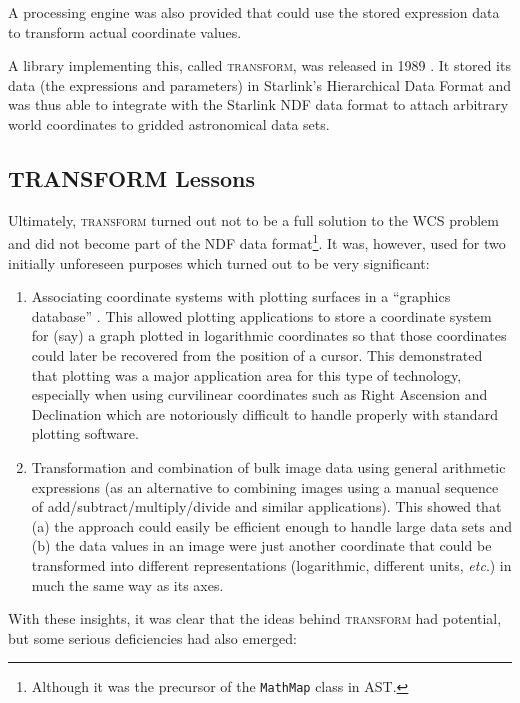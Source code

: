 \documentclass[final,authoryear,5p,times,twocolumn]{elsarticle}
\begin{document}
A processing engine was also provided that could use the stored
expression data to transform actual coordinate values.

A library implementing this, called \textsc{transform}, was released
in 1989 \citep{SUN61,1989StarB...4....7L}. It stored its data (the
expressions and parameters) in Starlink's Hierarchical Data Format
\citep[HDS;][]{SUN92,SSN27,2015HDS} and was thus able to integrate with the
Starlink NDF data format to attach arbitrary world coordinates to
gridded astronomical data sets.


\subsection{TRANSFORM Lessons}

Ultimately, \textsc{transform} turned out not to be a full solution to
the WCS problem and did not become part of the NDF data
format\footnote{Although it was the precursor of the
  \texttt{MathMap} class in AST.}. It was, however, used for two
initially unforeseen purposes which turned out to be very significant:

\begin{enumerate}
\item Associating coordinate systems with plotting surfaces in a
  ``graphics database'' \citep[see \emph{e.g.},][]{SUN48}. This allowed
  plotting applications to store a coordinate system for (say) a graph
  plotted in logarithmic coordinates so that those coordinates could
  later be recovered from the position of a cursor. This demonstrated
  that plotting was a major application area for this type of
  technology, especially when using curvilinear coordinates such as
  Right Ascension and Declination which are notoriously difficult to
  handle properly with standard plotting software.

\item Transformation and combination of bulk image data using general
  arithmetic expressions (as an alternative to combining images using
  a manual sequence of add/subtract/multiply/divide and similar
  applications). This showed that (a) the approach could easily be
  efficient enough to handle large data sets and (b) the data values in
  an image were just another coordinate that could be transformed into
  different representations (logarithmic, different units, \emph{etc}.) in
  much the same way as its axes.
\end{enumerate}

With these insights, it was clear that the ideas behind
\textsc{transform} had potential, but some serious deficiencies had
also emerged:
\end{document}
